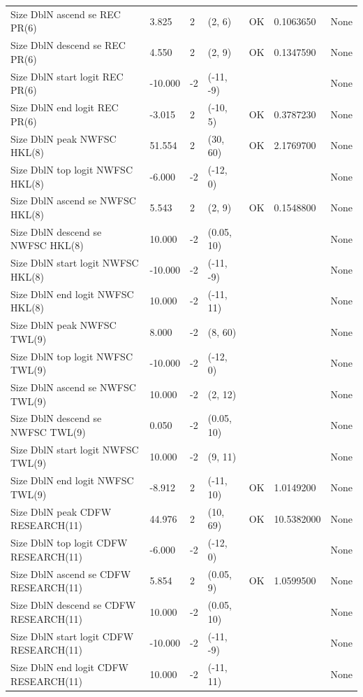 \documentclass[
  english,
  a4paper,
]{article}
\begin{document}
\begin{landscape}
\begin{longtable}[t]{lllllll}
Size DblN ascend se REC PR(6) & 3.825 & 2 & (2, 6) & OK & 0.1063650 & None\\
\addlinespace
Size DblN descend se REC PR(6) & 4.550 & 2 & (2, 9) & OK & 0.1347590 & None\\
Size DblN start logit REC PR(6) & -10.000 & -2 & (-11, -9) &  &  & None\\
Size DblN end logit REC PR(6) & -3.015 & 2 & (-10, 5) & OK & 0.3787230 & None\\
Size DblN peak NWFSC HKL(8) & 51.554 & 2 & (30, 60) & OK & 2.1769700 & None\\
Size DblN top logit NWFSC HKL(8) & -6.000 & -2 & (-12, 0) &  &  & None\\
\addlinespace
Size DblN ascend se NWFSC HKL(8) & 5.543 & 2 & (2, 9) & OK & 0.1548800 & None\\
Size DblN descend se NWFSC HKL(8) & 10.000 & -2 & (0.05, 10) &  &  & None\\
Size DblN start logit NWFSC HKL(8) & -10.000 & -2 & (-11, -9) &  &  & None\\
Size DblN end logit NWFSC HKL(8) & 10.000 & -2 & (-11, 11) &  &  & None\\
Size DblN peak NWFSC TWL(9) & 8.000 & -2 & (8, 60) &  &  & None\\
\addlinespace
Size DblN top logit NWFSC TWL(9) & -10.000 & -2 & (-12, 0) &  &  & None\\
Size DblN ascend se NWFSC TWL(9) & 10.000 & -2 & (2, 12) &  &  & None\\
Size DblN descend se NWFSC TWL(9) & 0.050 & -2 & (0.05, 10) &  &  & None\\
Size DblN start logit NWFSC TWL(9) & 10.000 & -2 & (9, 11) &  &  & None\\
Size DblN end logit NWFSC TWL(9) & -8.912 & 2 & (-11, 10) & OK & 1.0149200 & None\\
\addlinespace
Size DblN peak CDFW RESEARCH(11) & 44.976 & 2 & (10, 69) & OK & 10.5382000 & None\\
Size DblN top logit CDFW RESEARCH(11) & -6.000 & -2 & (-12, 0) &  &  & None\\
Size DblN ascend se CDFW RESEARCH(11) & 5.854 & 2 & (0.05, 9) & OK & 1.0599500 & None\\
Size DblN descend se CDFW RESEARCH(11) & 10.000 & -2 & (0.05, 10) &  &  & None\\
Size DblN start logit CDFW RESEARCH(11) & -10.000 & -2 & (-11, -9) &  &  & None\\
\addlinespace
Size DblN end logit CDFW RESEARCH(11) & 10.000 & -2 & (-11, 11) &  &  & None\\

\end{longtable}
\end{landscape}
\end{document}
